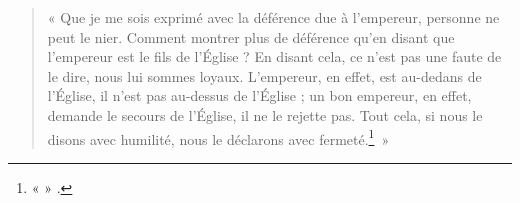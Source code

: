 \begin{quote}
    « Que je me sois exprimé avec la déférence due à l'empereur, personne ne peut le nier. Comment montrer plus de déférence qu'en disant que l'empereur est le fils de l'Église ? En disant cela, ce n'est pas une faute de le dire, nous lui sommes loyaux. L'empereur, en effet, est au-dedans de l'Église, il n'est pas au-dessus de l'Église ; un bon empereur, en effet, demande le secours de l'Église, il ne le rejette pas. Tout cela, si nous le disons avec humilité, nous le déclarons avec fermeté.\footnote{«  » \cite[\nopp 75A, 36]{ambroise_lettres}.}~»
\end{quote}

\bigskip

